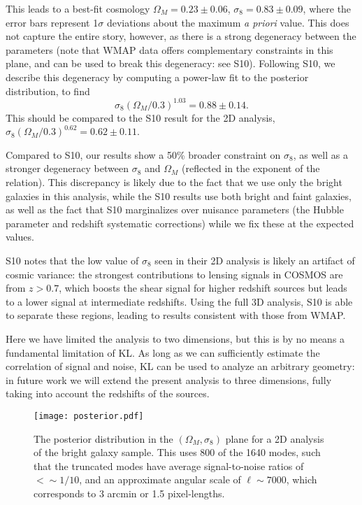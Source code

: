 This leads to a best-fit cosmology $\Omega_M = 0.23 \pm 0.06$,
$\sigma_8 = 0.83 \pm 0.09$, where the error bars represent 1$\sigma$
deviations about the maximum {\it a priori} value.
This does not capture the entire story, however, as there
is a strong degeneracy between the parameters (note that WMAP data offers
complementary constraints in this plane, and can be used to break this
degeneracy: see S10).  Following S10, we describe this degeneracy by
computing a power-law fit to the posterior distribution, to find
\begin{equation}
  \sigma_8 (\Omega_M / 0.3) ^ {1.03} = 0.88 \pm 0.14.
\end{equation}
This should be compared to the S10 result for the 2D analysis,
$\sigma_8 (\Omega_M / 0.3) ^ {0.62} = 0.62 \pm 0.11$.

Compared to S10, our results show a 50\% broader constraint on $\sigma_8$,
as well as a stronger degeneracy between $\sigma_8$ and $\Omega_M$ 
(reflected in the exponent of the relation).  This discrepancy is likely
due to the fact that we use only the bright galaxies in this analysis,
while the S10 results use both bright and faint galaxies, as well as the
fact that S10 marginalizes over nuisance parameters (the Hubble parameter
and redshift systematic corrections) while we fix these at the  expected
values.

S10 notes that the low value of $\sigma_8$ seen in their 2D analysis is likely
an artifact of cosmic variance: the strongest contributions to lensing
signals in COSMOS are from $z > 0.7$, which boosts the shear signal for higher
redshift sources but leads to a lower signal at intermediate redshifts.
Using the full 3D analysis, S10 is able to separate these regions, leading
to results consistent with those from WMAP.

Here we have limited the analysis to two dimensions, but this is by no means a
fundamental limitation of KL.  As long as we can sufficiently estimate the
correlation of signal and noise, KL can be used to analyze an arbitrary
geometry: in future work we will extend the present analysis to three
dimensions, fully taking into account the redshifts of the sources.

\begin{figure*}
 \centering
 \texttt{[image: posterior.pdf]}
 \caption[The posterior distribution in the $(\Omega_M, \sigma_8)$]
 {The posterior distribution in the $(\Omega_M, \sigma_8)$ plane
   for a 2D analysis of the bright galaxy sample.  This uses 800 of the
   1640 modes, such that the truncated modes have average signal-to-noise
   ratios of $<\sim 1/10$, and an approximate angular scale of
   $\ell \sim 7000$, which corresponds to 3 arcmin or 1.5 pixel-lengths.}
 \label{fig:posterior}
\end{figure*}

